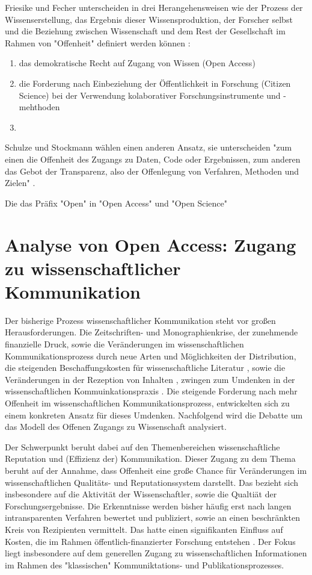 Friesike und Fecher unterscheiden in drei Herangehensweisen wie der Prozess der Wissenserstellung, das Ergebnis dieser Wissensproduktion, der Forscher selbst und die Beziehung zwischen Wissenschaft und dem Rest der Gesellschaft im Rahmen von "Offenheit" definiert werden können \cite{cite:9}:
\begin{enumerate}
\item das demokratische Recht auf Zugang von Wissen (Open Access)
\item die Forderung nach Einbeziehung der Öffentlichkeit in Forschung (Citizen Science) bei der Verwendung kolaborativer Forschungsinstrumente und -mehthoden
\item 
\end{enumerate}

Schulze und Stockmann wählen einen anderen Ansatz, sie unterscheiden "zum einen die Offenheit des Zugangs zu Daten, Code oder Ergebnissen, zum anderen das Gebot der Transparenz, also der Offenlegung von Verfahren, Methoden und Zielen" \cite{schulze_2013_open}.


Die das Präfix "Open" in "Open Access" und "Open Science" 


\section{Analyse von Open Access: Zugang zu wissenschaftlicher Kommunikation} 

Der bisherige Prozess wissenschaftlicher Kommunikation steht vor großen Herausforderungen. Die Zeitschriften- und Monographienkrise, der zunehmende finanzielle Druck, sowie die Veränderungen im wissenschaftlichen Kommunikationsprozess durch neue Arten und Möglichkeiten der Distribution, die steigenden Beschaffungskosten für wissenschaftliche Literatur \cite{cite:17} \cite{muller_2010_open}, sowie die Veränderungen in der Rezeption von Inhalten \cite{holub_2013_reception}, zwingen zum Umdenken in der wissenschaftlichen Kommuinkationspraxis \cite{suchen}. Die steigende Forderung nach mehr Offenheit im wissenschaftlichen Kommunikationsprozess, entwickelten sich zu einem konkreten Ansatz für dieses Umdenken. Nachfolgend wird die Debatte um das Modell des Offenen Zugangs zu Wissenschaft analysiert.

Der Schwerpunkt beruht dabei auf den Themenbereichen wissenschaftliche Reputation und (Effizienz der) Kommunikation. Dieser Zugang zu dem Thema beruht auf der Annahme, dass Offenheit eine große Chance für Veränderungen im wissenschaftlichen Qualitäts- und Reputationssystem darstellt. Das bezieht sich insbesondere auf die Aktivität der Wissenschaftler, sowie die Qualtiät der Forschungsergebnisse. Die Erkenntnisse werden bisher häufig erst nach langen intransparenten Verfahren bewertet und publiziert, sowie an einen beschränkten Kreis von Rezipienten vermittelt. Das hatte einen signifikanten Einfluss auf Kosten, die im Rahmen öffentlich-finanzierter Forschung entstehen \cite{suchen}. Der Fokus liegt insbesondere auf dem generellen Zugang zu wissenschaftlichen Informationen im Rahmen des "klassischen" Kommuniktations- und Publikationsprozesses. 

